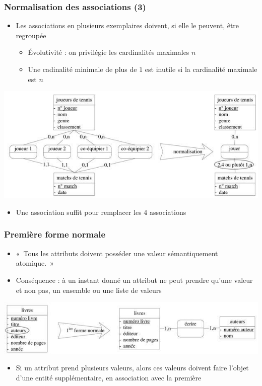 \begin{frame}
  \frametitle{Normalisation des associations (3)}
  \begin{itemize}
    \item Les associations en plusieurs exemplaires doivent, si elle le peuvent, être regroupée
      \begin{itemize}
        \item Évolutivité : on privilégie les cardinalités maximales $n$
        \item Une cadinalité minimale de plus de $1$ est inutile si la cardinalité maximale est $n$
      \end{itemize}
  \end{itemize}
  \begin{center}
    \includegraphics[width=0.9\linewidth]{association_plusieurs_exemplaires.jpg}
  \end{center}
  \begin{itemize}
    \item Une association suffit pour remplacer les 4 associations
  \end{itemize}
\end{frame}


\begin{frame}
  \frametitle{Première forme normale}
  \begin{itemize}
    \item «~Tous les attributs doivent posséder une valeur sémantiquement
        atomique.~»
    \item Conséquence : à un instant donné un attribut ne peut prendre qu'une
        valeur et non pas, un ensemble ou une liste de valeurs
  \end{itemize}
  \begin{center}
    \includegraphics[width=0.9\linewidth]{premiere_forme_normale.jpg}
  \end{center}
  \begin{itemize}
    \item Si un attribut prend plusieurs valeurs, alors ces valeurs doivent faire l'objet d'une entité
      supplémentaire, en association avec la première
  \end{itemize}
\end{frame}

